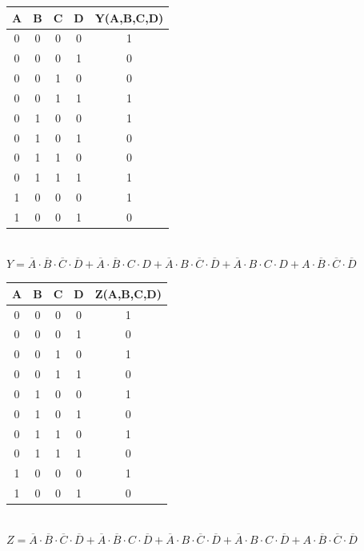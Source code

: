 \begin{center}
\begin{minipage}{0.45\textwidth}\centering
\begin{tabular}{cccc|c}
\rowcolor[HTML]{FFFC9E} 
A & B & C & D & \cellcolor[HTML]{FFCCC9}Y(A,B,C,D) \\ \hline
0 & 0 & 0 & 0 & 1                                  \\
0 & 0 & 0 & 1 & 0                                  \\
0 & 0 & 1 & 0 & 0                                  \\
0 & 0 & 1 & 1 & 1                                  \\
0 & 1 & 0 & 0 & 1                                  \\
0 & 1 & 0 & 1 & 0                                  \\
0 & 1 & 1 & 0 & 0                                  \\
0 & 1 & 1 & 1 & 1                                  \\
1 & 0 & 0 & 0 & 1                                  \\
1 & 0 & 0 & 1 & 0                                 
\end{tabular}\\[10pt]

$Y = \overline{A}\cdot\overline{B}\cdot\overline{C}\cdot\overline{D} + \overline{A}\cdot\overline{B}\cdot{}C\cdot{}D + \overline{A}\cdot{}B\cdot\overline{C}\cdot\overline{D} + \overline{A}\cdot{}B\cdot{}C\cdot{}D + A\cdot\overline{B}\cdot\overline{C}\cdot\overline{D}$
\end{minipage}
\begin{minipage}{0.45\textwidth}\centering
\begin{tabular}{cccc|c}
\rowcolor[HTML]{FFFC9E} 
A & B & C & D & \cellcolor[HTML]{FFCCC9}Z(A,B,C,D) \\ \hline
0 & 0 & 0 & 0 & 1                                  \\
0 & 0 & 0 & 1 & 0                                  \\
0 & 0 & 1 & 0 & 1                                  \\
0 & 0 & 1 & 1 & 0                                  \\
0 & 1 & 0 & 0 & 1                                  \\
0 & 1 & 0 & 1 & 0                                  \\
0 & 1 & 1 & 0 & 1                                  \\
0 & 1 & 1 & 1 & 0                                  \\
1 & 0 & 0 & 0 & 1                                  \\
1 & 0 & 0 & 1 & 0                                 
\end{tabular} \\[10pt] $Z = \overline{A}\cdot\overline{B}\cdot\overline{C}\cdot\overline{D} + \overline{A}\cdot\overline{B}\cdot{}C\cdot\overline{D} + \overline{A}\cdot{}B\cdot\overline{C}\cdot\overline{D} + \overline{A}\cdot{}B\cdot{}C\cdot\overline{D} + A\cdot\overline{B}\cdot\overline{C}\cdot\overline{D}$
\end{minipage}
\end{center}
